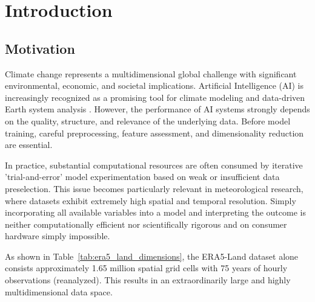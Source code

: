 




\chapter{Introduction}
\label{ch:introduction}


\section{Motivation}
\label{sec:introduction:motivation}
Climate change represents a multidimensional global challenge with significant environmental, economic, and societal implications. Artificial Intelligence (AI) is increasingly recognized as a promising tool for climate modeling and data-driven Earth system analysis \parencite{stern_climate_transition_2025}. However, the performance of AI systems strongly depends on the quality, structure, and relevance of the underlying data. Before model training, careful preprocessing, feature assessment, and dimensionality reduction are essential.

In practice, substantial computational resources are often consumed by iterative 'trial-and-error' model experimentation based on weak or insufficient data preselection. This issue becomes particularly relevant in meteorological research, where datasets exhibit extremely high spatial and temporal resolution. Simply incorporating all available variables into a model and interpreting the outcome is neither computationally efficient nor scientifically rigorous and on consumer hardware simply impossible.

As shown in Table~\ref{tab:era5_land_dimensions}, the ERA5-Land dataset alone consists approximately 1.65 million spatial grid cells with 75 years of hourly observations (reanalyzed). This results in an extraordinarily large and highly multidimensional data space.

